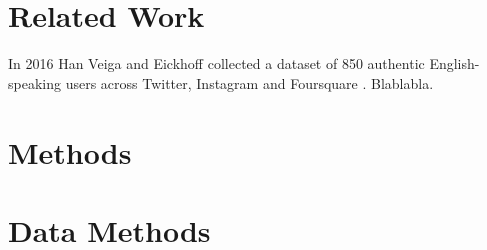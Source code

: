 \chapter{Related Work}\label{ch:rel}

In 2016 Han Veiga and Eickhoff collected a dataset of 850 authentic English-speaking users across Twitter, Instagram and Foursquare \cite{OSN}. Blablabla.


\chapter{Methods}

\chapter{Data Methods}